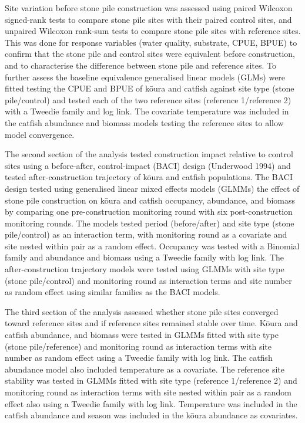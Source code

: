 \documentclass[
  12pt,
  a4paper,
  oneside]{scrbook}
\begin{document}
Site variation before stone pile construction was assessed using paired
Wilcoxon signed-rank tests to compare stone pile sites with their paired
control sites, and unpaired Wilcoxon rank-sum tests to compare stone
pile sites with reference sites. This was done for response variables
(water quality, substrate, CPUE, BPUE) to confirm that the stone pile
and control sites were equivalent before construction, and to
characterise the difference between stone pile and reference sites. To
further assess the baseline equivalence generalised linear models (GLMs)
were fitted testing the CPUE and BPUE of kōura and catfish against site
type (stone pile/control) and tested each of the two reference sites
(reference 1/reference 2) with a Tweedie family and log link. The
covariate temperature was included in the catfish abundance and biomass
models testing the reference sites to allow model convergence.

The second section of the analysis tested construction impact relative
to control sites using a before-after, control-impact (BACI) design
(Underwood 1994) and tested after-construction trajectory of kōura and
catfish populations. The BACI design tested using generalised linear
mixed effects models (GLMMs) the effect of stone pile construction on
kōura and catfish occupancy, abundance, and biomass by comparing one
pre-construction monitoring round with six post-construction monitoring
rounds. The models tested period (before/after) and site type (stone
pile/control) as an interaction term, with monitoring round as a
covariate and site nested within pair as a random effect. Occupancy was
tested with a Binomial family and abundance and biomass using a Tweedie
family with log link. The after-construction trajectory models were
tested using GLMMs with site type (stone pile/control) and monitoring
round as interaction terms and site number as random effect using
similar families as the BACI models.

The third section of the analysis assessed whether stone pile sites
converged toward reference sites and if reference sites remained stable
over time. Kōura and catfish abundance, and biomass were tested in GLMMs
fitted with site type (stone pile/reference) and monitoring round as
interaction terms with site number as random effect using a Tweedie
family with log link. The catfish abundance model also included
temperature as a covariate. The reference site stability was tested in
GLMMs fitted with site type (reference 1/reference 2) and monitoring
round as interaction terms with site nested within pair as a random
effect also using a Tweedie family with log link. Temperature was
included in the catfish abundance and season was included in the kōura
abundance as covariates.
\end{document}
